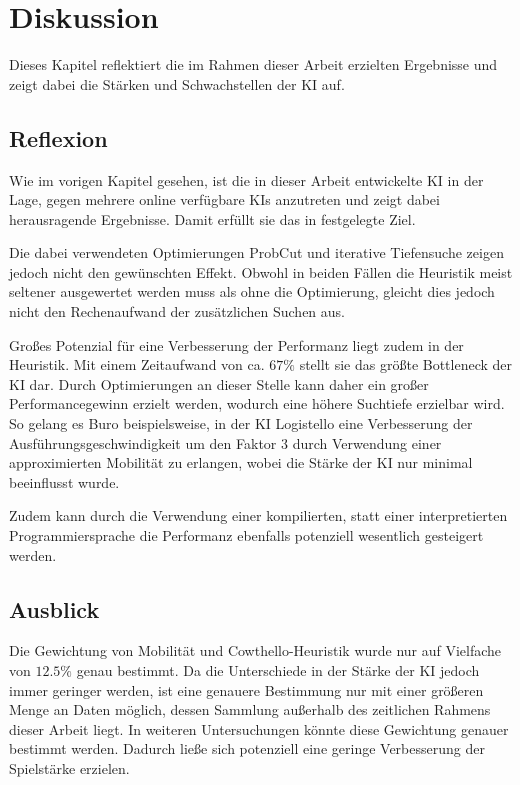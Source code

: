 
\chapter{Diskussion}
\label{chap:diskussion}
Dieses Kapitel reflektiert die im Rahmen dieser Arbeit erzielten Ergebnisse und zeigt dabei die Stärken und
Schwachstellen der \ac{KI} auf.

\section{Reflexion}
Wie im vorigen Kapitel gesehen, ist die in dieser Arbeit entwickelte \ac{KI} in der Lage, gegen mehrere
online verfügbare \acp{KI} anzutreten und zeigt dabei herausragende Ergebnisse. Damit erfüllt sie das in \label{sec:goal}
festgelegte Ziel.

Die dabei verwendeten Optimierungen ProbCut und iterative Tiefensuche zeigen jedoch nicht den gewünschten Effekt.
Obwohl in beiden Fällen die Heuristik meist seltener ausgewertet werden muss als ohne die Optimierung, gleicht dies jedoch
nicht den Rechenaufwand der zusätzlichen Suchen aus.

Großes Potenzial für eine Verbesserung der Performanz liegt zudem in der Heuristik. Mit einem Zeitaufwand von ca.
\(67\%\) stellt sie das größte Bottleneck der \ac{KI} dar. Durch Optimierungen an dieser Stelle kann daher ein großer
Performancegewinn erzielt werden, wodurch eine höhere Suchtiefe erzielbar wird. So gelang es Buro beispielsweise, in der
\ac{KI} Logistello eine Verbesserung der Ausführungsgeschwindigkeit um den Faktor 3 durch Verwendung einer approximierten
Mobilität zu erlangen, wobei die Stärke der \ac{KI} nur minimal beeinflusst wurde. \cite[S.~8]{evaluationfunctions}

Zudem kann durch die Verwendung einer kompilierten, statt einer interpretierten Programmiersprache die Performanz
ebenfalls potenziell wesentlich gesteigert werden.


\section{Ausblick}
Die Gewichtung von Mobilität und Cowthello-Heuristik wurde nur auf Vielfache von \(12.5\%\) genau bestimmt. Da die
Unterschiede in der Stärke der \ac{KI} jedoch immer geringer werden, ist eine genauere Bestimmung nur mit einer größeren
Menge an Daten möglich, dessen Sammlung außerhalb des zeitlichen Rahmens dieser Arbeit liegt. In weiteren Untersuchungen
könnte diese Gewichtung genauer bestimmt werden. Dadurch ließe sich potenziell eine geringe Verbesserung der Spielstärke
erzielen.

